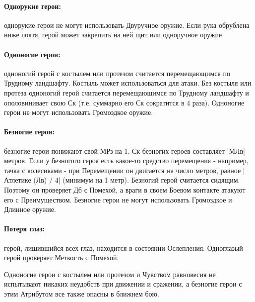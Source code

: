 \paragraph{Однорукие герои:} однорукие герои не могут использовать Двуручное оружие. Если рука обрублена ниже локтя, герой может закрепить на ней щит или одноручное оружие.
\paragraph{Одноногие герои:} одноногий герой с костылем или протезом считается перемещающимся по Трудному ландшафту. Костыль может использоваться для атаки. Без костыля или протеза одноногий герой считается перемещающимся по Трудному ландшафту и ополовинивает свою Ск (т.е. суммарно его Ск сократится в 4 раза). Одноногие герои не могут использовать Громоздкое оружие.
\paragraph{Безногие герои:} безногие герои понижают свой МРз на 1. Ск безногих героев составляет |МЛв| метров. Если у безногого героя есть какое-то средство перемещения - например, тачка с колесиками - при Перемещении он двигается на число метров, равное |Атлетике (Лв) / 4| (минимум на 1 метр). Безногий герой считается сидящим. Поэтому он проверяет Дб с Помехой, а враги в своем Боевом контакте атакуют его с Преимуществом. Безногие герои не могут использовать Громоздкое и Длинное оружие.
\paragraph{Потеря глаз:} герой, лишившийся всех глаз, находится в состоянии Ослепления. Одноглазый герой проверяет Меткость с Помехой. 
\begin{tcolorbox}
  Одноногие герои с костылем или протезом и Чувством равновесия не испытывают никаких неудобств при движении и сражении, а безногие герои с этим Атрибутом все также опасны в ближнем бою.
\end{tcolorbox}


